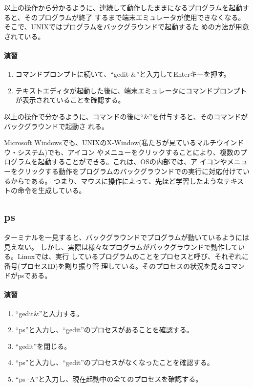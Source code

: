 以上の操作から分かるように、連続して動作したままになるプログラムを起動すると、そのプログラムが終了
するまで端末エミュレータが使用できなくなる。そこで、UNIXではプログラムをバックグラウンドで起動するた
めの方法が用意されている。

\paragraph{演習}
\begin{enumerate}
\item コマンドプロンプトに続いて、``gedit \&''と入力してEnterキーを押す。
\item テキストエディタが起動した後に、端末エミュレータにコマンドプロンプトが表示されていることを確認する。
\end{enumerate}

以上の操作で分かるように、コマンドの後に``\&''を付与すると、そのコマンドがバックグラウンドで起動さ
れる。

Microsoft Windowsでも、UNIXのX-Window(私たちが見ているマルチウインドウ・システム)でも、アイコン
やメニューをクリックすることにより、複数のプログラムを起動することができる。これは、OSの内部では、ア
イコンやメニューをクリックする動作をプログラムのバックグラウンドでの実行に対応付けているからである。
つまり、マウスに操作によって、先ほど学習したようなテキストの命令を生成している。

\subsection{ps}

ターミナルを一見すると、バックグラウンドでプログラムが動いているようには見えない。
しかし、実際は様々なプログラムがバックグラウンドで動作している。Linuxでは、実行
しているプログラムのことをプロセスと呼び、それぞれに番号(プロセスID)を割り振り管
理している。そのプロセスの状況を見るコマンドがpsである。

\paragraph{演習}
\begin{enumerate}
\item ``gedit\&''と入力する。
\item ``ps''と入力し、``gedit''のプロセスがあることを確認する。
\item ``gedit''を閉じる。
\item ``ps''と入力し、``gedit''のプロセスがなくなったことを確認する。
\item ``ps -A''と入力し、現在起動中の全てのプロセスを確認する。
\end{enumerate}

